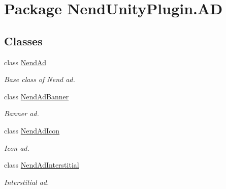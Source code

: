 \hypertarget{namespace_nend_unity_plugin_1_1_a_d}{}\section{Package Nend\+Unity\+Plugin.\+A\+D}
\label{namespace_nend_unity_plugin_1_1_a_d}
\subsection*{Classes}
\begin{DoxyCompactItemize}
\item 
class \hyperlink{class_nend_unity_plugin_1_1_a_d_1_1_nend_ad}{Nend\+Ad}
\begin{DoxyCompactList}\small\item\em Base class of Nend ad. \end{DoxyCompactList}\item 
class \hyperlink{class_nend_unity_plugin_1_1_a_d_1_1_nend_ad_banner}{Nend\+Ad\+Banner}
\begin{DoxyCompactList}\small\item\em Banner ad. \end{DoxyCompactList}\item 
class \hyperlink{class_nend_unity_plugin_1_1_a_d_1_1_nend_ad_icon}{Nend\+Ad\+Icon}
\begin{DoxyCompactList}\small\item\em Icon ad. \end{DoxyCompactList}\item 
class \hyperlink{class_nend_unity_plugin_1_1_a_d_1_1_nend_ad_interstitial}{Nend\+Ad\+Interstitial}
\begin{DoxyCompactList}\small\item\em Interstitial ad. \end{DoxyCompactList}\end{DoxyCompactItemize}
